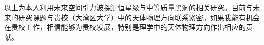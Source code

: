 \documentclass[12pt,a4paper,sans]{article}%
\begin{document}
\begin{CJK}{UTF8}{gbsn}
以上为本人利用未来空间引力波探测恒星级与中等质量黑洞的相关研究。目前与未来的研究课题与贵校（大湾区大学）中的天体物理方向联系紧密。如果我能有机会在贵校工作，相信能够为贵校发展，特别是理学中的天体物理方向作出相应的贡献。





%
\end{CJK}
\end{document}
